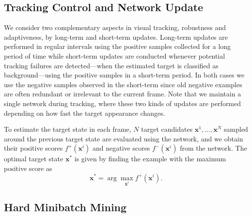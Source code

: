 \documentclass[10pt,twocolumn,letterpaper]{article}
\begin{document}
\subsection{Tracking Control and Network Update}
We consider two complementary aspects in visual tracking, robustness and adaptiveness, by long-term and short-term updates.
Long-term updates are performed in regular intervals using the positive samples collected for a long period of time while short-term updates are conducted whenever potential tracking failures are detected---when the estimated target is classified as background---using the positive samples in a short-term period.
In both cases we use the negative samples observed in the short-term since old negative examples are often redundant or irrelevant to the current frame.
Note that we maintain a single network during tracking, where these two kinds of updates are performed depending on how fast the target appearance changes.

To estimate the target state in each frame, $N$ target candidates $\mathbf{x}^1,\dots,\mathbf{x}^N$ sampled around the previous target state are evaluated using the network, and we obtain their positive scores $f^+(\mathbf{x}^i)$ and negative scores $f^-(\mathbf{x}^i)$ from the network. 
The optimal target state $\mathbf{x}^*$ is given by finding the example with the maximum positive score as
\begin{equation}
\label{eq:target}
\mathbf{x}^* = \arg\!\max_{\mathbf{x}^i} f^+(\mathbf{x}^i).
\end{equation}

\subsection{Hard Minibatch Mining}
\end{document}
